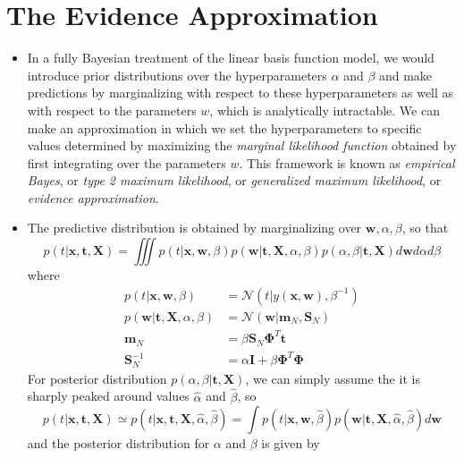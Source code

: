 \documentclass[12pt, a4paper]{article}
\newcommand{\N}{\mathcal{N}}
\begin{document}
    \section{The Evidence Approximation}
    \begin{itemize}
        \item In a fully Bayesian treatment of the linear basis function model, we would introduce prior 
        distributions over the hyperparameters $\alpha$ and $\beta$ and make predictions by marginalizing
        with respect to these hyperparameters as well as with respect to the parameters $w$, which is 
        analytically intractable. We can make an approximation in which we set the hyperparameters to specific
        values determined by maximizing the \textit{marginal likelihood function} obtained by first 
        integrating over the parameters $w$. This framework is known as \textit{empirical Bayes}, or 
        \textit{type 2 maximum likelihood}, or \textit{generalized maximum likelihood}, or \textit{evidence 
        approximation}.
        \item The predictive distribution is obtained by marginalizing over $\bm{w},\alpha,\beta$, so that
        \begin{equation}
            \label{eq:PredictiveDistribution}
            p(t|\bm{x},\bm{t},\bm{X})=\iiint p(t|\bm{x},\bm{w},\beta)p(\bm{w}|\bm{t},\bm{X},\alpha,\beta)
            p(\alpha,\beta|\bm{t},\bm{X})d\bm{w}d\alpha d\beta
        \end{equation}
        where 
        \begin{align*}
            p(t|\bm{x},\bm{w},\beta)&=\N(t|y(\bm{x},\bm{w}),\beta^{-1})\\
            p(\bm{w}|\bm{t},\bm{X},\alpha,\beta)&=\N(\bm{w}|\bm{m}_N,\bm{S}_N)\\
            \bm{m}_N&=\beta\bm{S}_N\bm{\Phi}^T\bm{t}\\
            \bm{S}_N^{-1}&=\alpha\bm{I}+\beta\bm{\Phi}^T\bm{\Phi}
        \end{align*}
        For posterior distribution $p(\alpha,\beta|\bm{t},\bm{X})$, we can simply assume the it is sharply
        peaked around values $\hat{\alpha}$ and $\hat{\beta}$, so
        \begin{equation*}
            p(t|\bm{x},\bm{t},\bm{X})\simeq p(t|\bm{x},\bm{t},\bm{X},\hat{\alpha},\hat{\beta})=
            \int p(t|\bm{x},\bm{w},\hat{\beta})p(\bm{w}|\bm{t},\bm{X},\hat{\alpha},\hat{\beta})d\bm{w}
        \end{equation*}
        and the posterior distribution for $\alpha$ and $\beta$ is given by

\end{itemize}
\end{document}
